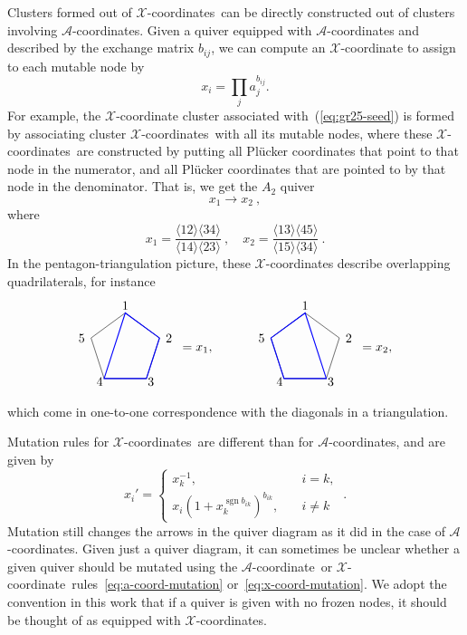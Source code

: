 \documentclass[11pt]{article}
\DeclareMathOperator{\sgn}{sgn}
\def\ket#1{\langle #1 \rangle}
\def\x{\mathcal{X}}
\def\xcoord{$\mathcal{X}$-coordinate}
\def\xcoords{$\mathcal{X}$-coordinates}
\def\a{\mathcal{A}}
\def\acoord{$\mathcal{A}$-coordinate}
\def\acoords{$\mathcal{A}$-coordinates}
\def\drawLabeledPentagon{
\coordinate (P1) at (90:1);
\coordinate (P2) at (18:1);
\coordinate (P3) at (306:1);
\coordinate (P4) at (234:1);
\coordinate (P5) at (162:1);
\draw (P1) -- (P2) -- (P3) -- (P4) -- (P5) -- cycle;
\draw (0,1.2) node {1};
\draw (1,.3) node[anchor=west] {2};
\draw (.5,-.9) node[anchor=west] {3};
\draw (-.5,-.9) node[anchor=east] {4};
\draw (-1,.3) node[anchor=east] {5};
}
\begin{document}
Clusters formed out of \xcoords\ can be directly constructed out of clusters involving \acoords. Given a quiver equipped with $\a$-coordinates and described by the exchange matrix $b_{ij}$, we can compute an $\x$-coordinate to assign to each mutable node by
\begin{equation}
	x_i = \prod_j a_j^{b_{ij}}. 	
\end{equation} 
For example, the $\x$-coordinate cluster associated with~(\ref{eq:gr25-seed}) is formed by associating cluster \xcoords\ with all its mutable nodes, where these \xcoords\ are constructed by putting all Pl\"ucker coordinates that point to that node in the numerator, and all Pl\"ucker coordinates that are pointed to by that node in the denominator. That is, we get the $A_2$ quiver
\begin{equation} \label{eq:a2_x_seed}
	x_1 \to x_2\ ,
\end{equation}
where
\begin{equation}\label{def:xcoordsA2}
	x_1 = \frac{\ket{12}\ket{34}}{\ket{14}\ket{23}} \ , \quad x_2 = \frac{\ket{13}\ket{45}}{\ket{15}\ket{34}} \ .
\end{equation}
In the pentagon-triangulation picture, these $\x$-coordinates describe overlapping quadrilaterals, for instance
\begin{equation}
\begin{gathered}
\begin{tikzpicture}
  \drawLabeledPentagon
  \draw[color=blue, thick] (P1) -- (P2) -- (P3) -- (P4) -- cycle;
  \draw (2,0) node {$=x_1,$};
\begin{scope}[xshift = 5cm]
  \drawLabeledPentagon
  \draw[color=blue, thick] (P1) -- (P3) -- (P4) -- (P5) -- cycle;
  \draw (2,0) node {$=x_2,$};
\end{scope}
\end{tikzpicture} 
\end{gathered}
\end{equation}
which come in one-to-one correspondence with the diagonals in a triangulation.

Mutation rules for \xcoords\ are different than for \acoords, and are given by
\begin{equation}
  \label{eq:x-coord-mutation}
  x_{i}' =
  \begin{cases}
    x_{k}^{-1}, &\quad i=k,\\
    x_{i} (1+x_{k}^{\sgn b_{i k}})^{b_{i k}}, &\quad i \neq k
  \end{cases}\ .
\end{equation}
Mutation still changes the arrows in the quiver diagram as it did in the case of \acoords.  Given just a quiver diagram, it can sometimes be unclear whether a given quiver should be mutated using the \acoord\ or \xcoord\ rules~\eqref{eq:a-coord-mutation} or~\eqref{eq:x-coord-mutation}. We adopt the convention in this work that if a quiver is given with no frozen nodes, it should be thought of as equipped with \xcoords.
\end{document}
